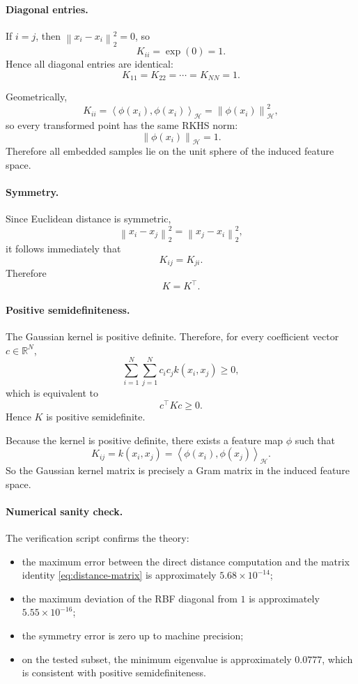 \documentclass[11pt]{article}
\newcommand{\R}{\mathbb{R}}
\newcommand{\Hspace}{\mathcal{H}}
\newcommand{\norm}[1]{\left\lVert #1 \right\rVert}
\newcommand{\inner}[2]{\left\langle #1, #2 \right\rangle}
\newcommand{\transpose}{^{\top}}
\begin{document}
\paragraph{Diagonal entries.}
If $i=j$, then $\norm{x_i-x_i}_2^2 = 0$, so
\[
K_{ii} = \exp(0) = 1.
\]
Hence all diagonal entries are identical:
\[
K_{11} = K_{22} = \cdots = K_{NN} = 1.
\]

Geometrically,
\[
K_{ii}
=
\inner{\phi(x_i)}{\phi(x_i)}_{\Hspace}
=
\norm{\phi(x_i)}_{\Hspace}^2,
\]
so every transformed point has the same RKHS norm:
\[
\norm{\phi(x_i)}_{\Hspace} = 1.
\]
Therefore all embedded samples lie on the unit sphere of the induced feature space.

\paragraph{Symmetry.}
Since Euclidean distance is symmetric,
\[
\norm{x_i-x_j}_2^2 = \norm{x_j-x_i}_2^2,
\]
it follows immediately that
\[
K_{ij} = K_{ji}.
\]
Therefore
\[
K = K\transpose.
\]

\paragraph{Positive semidefiniteness.}
The Gaussian kernel is positive definite. Therefore, for every coefficient vector $c \in \R^N$,
\[
\sum_{i=1}^N \sum_{j=1}^N c_i c_j k(x_i,x_j) \ge 0,
\]
which is equivalent to
\[
c\transpose K c \ge 0.
\]
Hence $K$ is positive semidefinite.

Because the kernel is positive definite, there exists a feature map $\phi$ such that
\[
K_{ij} = k(x_i,x_j) = \inner{\phi(x_i)}{\phi(x_j)}_{\Hspace}.
\]
So the Gaussian kernel matrix is precisely a Gram matrix in the induced feature space.

\paragraph{Numerical sanity check.}
The verification script confirms the theory:
\begin{itemize}
\item the maximum error between the direct distance computation and the matrix identity \eqref{eq:distance-matrix} is approximately $5.68 \times 10^{-14}$;
\item the maximum deviation of the RBF diagonal from $1$ is approximately $5.55 \times 10^{-16}$;
\item the symmetry error is zero up to machine precision;
\item on the tested subset, the minimum eigenvalue is approximately $0.0777$, which is consistent with positive semidefiniteness.
\end{itemize}
\end{document}
